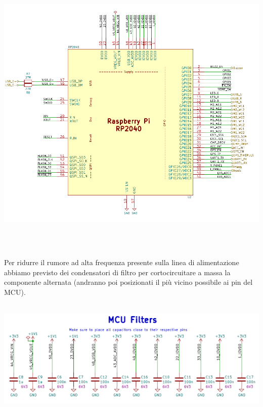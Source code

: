 \begin{center}
\includegraphics[width=6.5in,height=5.56944in]{figures/image54.png}
\captionsetup{type=figure}
\end{center}

Per ridurre il rumore ad alta frequenza presente sulla linea di
alimentazione abbiamo previsto dei condensatori di filtro per
cortocircuitare a massa la componente alternata (andranno poi
posizionati il più vicino possibile ai pin del MCU).

\begin{center}
\includegraphics[width=6.33776in,height=2.22396in]{figures/image23.png}
\captionsetup{type=figure}
\end{center}

